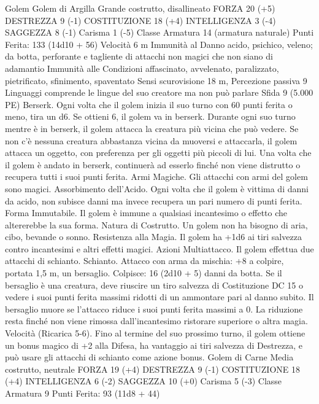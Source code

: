 \begin{multicols}{2}
Golem
Golem di Argilla
Grande costrutto, disallineato
FORZA 20 (+5)
DESTREZZA 9 (-1)
COSTITUZIONE 18 (+4)
INTELLIGENZA 3 (-4)
SAGGEZZA 8 (-1)
Carisma 1 (-5)
Classe Armatura 14 (armatura naturale)
\hspace*{0pt}\hfill{Punti Ferita}: 133 (14d10 + 56)
Velocità 6 m
Immunità al Danno acido, psichico, veleno; da botta,
perforante e tagliente di attacchi non magici che non siano di
adamantio
Immunità alle Condizioni affascinato, avvelenato, paralizzato,
pietrificato, sfinimento, spaventato
Sensi scurovisione 18 m, Percezione passiva 9
Linguaggi comprende le lingue del suo creatore ma non può
parlare
Sfida 9 (5.000 PE)
Berserk. Ogni volta che il golem inizia il suo turno con 60 punti
ferita o meno, tira un d6. Se ottieni 6, il golem va in berserk.
Durante ogni suo turno mentre è in berserk, il golem attacca la
creatura più vicina che può vedere. Se non c’è nessuna creatura
abbastanza vicina da muoversi e attaccarla, il golem attacca un
oggetto, con preferenza per gli oggetti più piccoli di lui. Una
volta che il golem è andato in berserk, continuerà ad esserlo
finché non viene distrutto o recupera tutti i suoi punti ferita.
Armi Magiche. Gli attacchi con armi del golem sono magici.
Assorbimento dell’Acido. Ogni volta che il golem è vittima di
danni da acido, non subisce danni ma invece recupera un pari
numero di punti ferita.
Forma Immutabile. Il golem è immune a qualsiasi incantesimo o
effetto che altererebbe la sua forma.
Natura di Costrutto. Un golem non ha bisogno di aria, cibo,
bevande o sonno.
Resistenza alla Magia. Il golem ha +1d6 ai tiri salvezza
contro incantesimi e altri effetti magici.
Azioni
Multiattacco. Il golem effettua due attacchi di schianto.
Schianto. Attacco con arma da mischia: +8 a colpire, portata 1,5
m, un bersaglio.
Colpisce: 16 (2d10 + 5) danni da botta. Se il bersaglio è una
creatura, deve riuscire un tiro salvezza di Costituzione DC 15 o
vedere i suoi punti ferita massimi ridotti di un ammontare pari al
danno subito. Il bersaglio muore se l’attacco riduce i suoi punti
ferita massimi a 0. La riduzione resta finché non viene rimossa
dall’incantesimo ristorare superiore o altra magia.
Velocità (Ricarica 5-6). Fino al termine del suo prossimo turno,
il golem ottiene un bonus magico di +2 alla Difesa, ha vantaggio ai
tiri salvezza di Destrezza, e può usare gli attacchi di schianto
come azione bonus.
Golem di Carne
Media costrutto, neutrale
FORZA 19 (+4)
DESTREZZA 9 (-1)
COSTITUZIONE 18 (+4)
INTELLIGENZA 6 (-2)
SAGGEZZA 10 (+0)
Carisma 5 (-3)
Classe Armatura 9
\hspace*{0pt}\hfill{Punti Ferita}: 93 (11d8 + 44)

\end{multicols}
